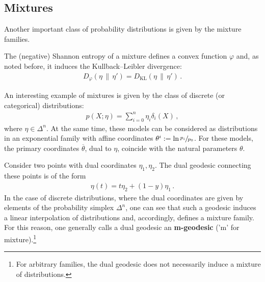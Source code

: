 \subsection{Mixtures}

    Another important class of probability distributions is given by the mixture families.

    The (negative) Shannon entropy of a mixture defines a convex function $\varphi$ and, as noted before, it induces the Kullback--Leibler divergence:
    \begin{gather}
        D_\varphi(\eta\,\|\,\eta') = D_{\text{KL}}(\eta\,\|\,\eta')\,.
    \end{gather}

    \begin{example}
        An interesting example of mixtures is given by the class of discrete (or categorical) distributions:
        \begin{gather}
            p(X;\eta) = \sum_{i=0}^n\eta_i\delta_i(X)\,,
        \end{gather}
        where $\eta\in\Delta^n$. At the same time, these models can be considered as distributions in an exponential family with affine coordinates $\theta^i:=\ln\sfrac{p_i}{p_0}$. For these models, the primary coordinates $\overline{\theta}$, dual to $\eta$, coincide with the natural parameters $\theta$.
    \end{example}

    Consider two points with dual coordinates $\eta_1,\eta_2$. The dual geodesic connecting these points is of the form
    \begin{gather}
        \eta(t) = t\eta_2 + (1-y)\eta_1\,.
    \end{gather}
    In the case of discrete distributions, where the dual coordinates are given by elements of the probability simplex $\Delta^n$, one can see that such a geodesic induces a linear interpolation of distributions and, accordingly, defines a mixture family. For this reason, one generally calls a dual geodesic an \textbf{m-geodesic} ('m' for mixture).\footnote{For arbitrary families, the dual geodesic does not necessarily induce a mixture of distributions.}

